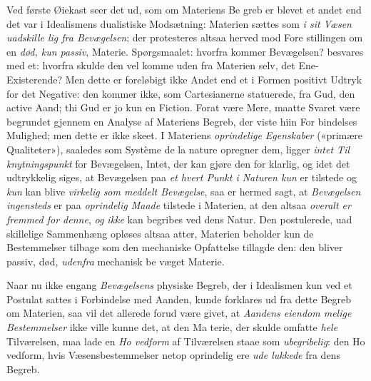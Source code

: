 Ved første Øiekast seer det ud, som om Materiens Be\-%
greb er blevet et andet end det var i Idealismens dualistiske
Modsætning: Materien sættes som \emph{i sit Væsen uadskille\-%
lig fra Bevægelsen}; der protesteres altsaa herved mod Fore\-%
stillingen om en \emph{død, kun passiv}, Materie. Spørgsmaalet:
hvorfra kommer Bevægelsen? besvares med et: hvorfra skulde
den vel komme uden fra Materien selv, det Ene-Existerende?
Men dette er foreløbigt ikke Andet end et i Formen positivt
Udtryk for det Negative: den kommer ikke, som Cartesianerne
statuerede, fra Gud, den active Aand; thi Gud er jo kun en
Fiction. Forat være Mere, maatte Svaret være begrundet
gjennem en Analyse af Materiens Begreb, der viste hiin For\-%
bindelses Mulighed; men dette er ikke skeet. I Materiens
\emph{oprindelige Egenskaber} («primære Qualiteter»), saaledes
som Système de la nature opregner dem, ligger \emph{intet Til\-%
knytningspunkt} for Bevægelsen, Intet, der kan gjøre den for\-%
klarlig, og idet det udtrykkelig siges, at Bevægelsen paa \emph{et\-%
hvert Punkt i Naturen kun} er tilstede og \emph{kun} kan blive
\emph{virkelig som meddelt Bevægelse}, saa er hermed sagt, at
\emph{Bevægelsen ingensteds} er paa \emph{oprindelig Maade} tilstede
i Materien, at den altsaa \emph{overalt er fremmed for denne},
\emph{og ikke} kan begribes ved dens Natur. Den postulerede, uad\-%
skillelige Sammenhæng opløses altsaa atter, Materien beholder
kun de Bestemmelser tilbage som den mechaniske Opfattelse
tillagde den: den bliver passiv, død, \emph{udenfra} mechanisk be\-%
væget Materie.

Naar nu ikke engang \emph{Bevægelsens} physiske Begreb, der
i Idealismen kun ved et Postulat sattes i Forbindelse med
Aanden, kunde forklares ud fra dette Begreb om Materien,
saa vil det allerede forud være givet, at \emph{Aandens eiendom\-%
melige Bestemmelser} ikke ville kunne det, at den Ma\-%
terie, der skulde omfatte \emph{hele} Tilværelsen, maa lade en \emph{Ho\-%
vedform} af Tilværelsen staae som \emph{ubegribelig}: den Ho\-%
vedform, hvis Væsensbestemmelser netop oprindelig ere \emph{ude\-%
lukkede} fra dens Begreb.

